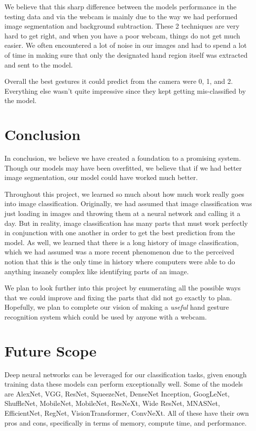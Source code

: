 \documentclass[letterpaper]{article} %
\begin{document}
We believe that this sharp difference between the models performance in the testing data and via the webcam is mainly due to the way we had performed image segmentation and background subtraction. These 2 techniques are very hard to get right, and when you have a poor webcam, things do not get much easier. We often encountered a lot of noise in our images and had to spend a lot of time in making sure that only the designated hand region itself was extracted and sent to the model.

Overall the best gestures it could predict from the camera were 0, 1, and 2. Everything else wasn't quite impressive since they kept getting mis-classified by the model.

\section{Conclusion}
In conclusion, we believe we have created a foundation to a promising system. Though our models may have been overfitted, we believe that if we had better image segmentation, our model could have worked much better. 

Throughout this project, we learned so much about how much work really goes into image classification. Originally, we had assumed that image classification was just loading in images and throwing them at a neural network and calling it a day. But in reality, image classification has many parts that must work perfectly in conjunction with one another in order to get the best prediction from the model. As well, we learned that there is a long history of image classification, which we had assumed was a more recent phenomenon due to the perceived notion that this is the only time in history where computers were able to do anything insanely complex like identifying parts of an image.

We plan to look further into this project by enumerating all the possible ways that we could improve and fixing the parts that did not go exactly to plan. Hopefully, we plan to complete our vision of making a \textit{useful} hand gesture recognition system which could be used by anyone with a webcam.

\section{Future Scope}
Deep neural networks can be leveraged for our classification tasks, given enough training data these models can perform exceptionally well. Some of the models are AlexNet, VGG, ResNet, SqueezeNet, DenseNet Inception, GoogLeNet, ShuffleNet, MobileNet, MobileNet, ResNeXt, Wide ResNet, MNASNet, EfficientNet, RegNet, VisionTransformer, ConvNeXt. All of these have their own pros and cons, specifically in terms of memory, compute time, and performance.
\end{document}
